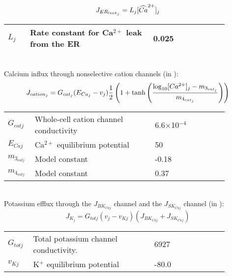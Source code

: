\begin{equation} \label{eq:JERleakj}
J_{ER_{leak_{j}}} = L_{j}[\widehat{Ca}^{2+}]_{j}
\end{equation}
%
\begin{table}[h!]
\centering
\begin{tabular}{ p{0.09\linewidth}  >{\footnotesize} p{0.5\linewidth}  >{\footnotesize} p{0.27\linewidth} >{\footnotesize} p{0.03\linewidth} }
\hline
$L_{j}$      			& Rate constant for Ca$^{2+}$ leak from the ER 		 & 0.025	\pers			& \cite{Koenigsberger2006} \\
\hline
\end{tabular}
\label{tab:JKj}
\end{table}
\\
%
Calcium influx through nonselective cation channels (in \uMs):
\begin{equation} \label{eq:Jcationj}
J_{cation_{j}} = G_{cat_{j}} (E_{Ca_{j}} - v_{j}) \frac{1}{2} \left(   1+ \mathrm{tanh}  \left(  \frac{\mathrm{log}_{10} [Ca^{2+}]_{j} - m_{3_{cat_{j}}} }    {m_{4_{cat_{j}}}}   \right)      \right) 
\end{equation}
%
%
\begin{table}[h!]
\centering
\begin{tabular}{ p{0.09\linewidth}  >{\footnotesize} p{0.5\linewidth}  >{\footnotesize} p{0.27\linewidth} >{\footnotesize} p{0.03\linewidth} }
\hline
$G_{cat j}$      		& Whole-cell cation channel conductivity						 	& 6.6$\times$10$^{-4}$ \uMpmVs	& \cite{Koenigsberger2006} \\
$E_{Caj}$      			& Ca$^{2+}$ equilibrium potential								 	& 50 \mV		& \cite{Koenigsberger2006} \\

$m_{3_{catj}}$      	& Model constant				 	& -0.18 \uM		& \cite{Koenigsberger2006} \\
$m_{4_{catj}}$      	& Model constant					& 0.37  \uM		& \cite{Koenigsberger2006} \\
\hline
\end{tabular}
\label{tab:Jcationj}
\end{table}
\\
%
Potassium efflux through the $J_{BK_{Caj}}$ channel and the $J_{SK_{Caj}}$ channel (in \uMs):
\begin{equation} \label{eq:JKj}
J_{K_{j}} = G_{totj} (v_{j}-v_{Kj}) \left(   J_{BK_{Caj}} + J_{SK_{Caj}} \right) 
\end{equation}
%
%
\begin{table}[h!]
\centering
\begin{tabular}{ p{0.09\linewidth}  >{\footnotesize} p{0.5\linewidth}  >{\footnotesize} p{0.27\linewidth} >{\footnotesize} p{0.03\linewidth} }
\hline
$G_{totj}$      		& Total potassium channel conductivity.						 		& 6927 \pS		& \cite{Koenigsberger2006} \\
$v_{Kj}$      			& K$^{+}$ equilibrium potential					 			 		& -80.0 \mV		& \cite{Koenigsberger2006} \\
\hline
\end{tabular}
\label{tab:JKj}
\end{table}
